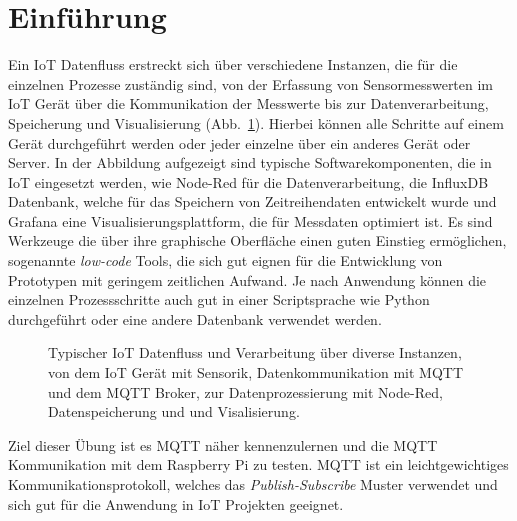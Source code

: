 \documentclass[
  11pt,
  a4paperpaper,
  oneside, openany  ,captions=tableheading
]{scrbook}
\theoremstyle{definition}
\theoremstyle{remark}
\begin{document}
\hfill\break

\section{Einführung}\label{einfuxfchrung-6}

Ein IoT Datenfluss erstreckt sich über verschiedene Instanzen, die für
die einzelnen Prozesse zuständig sind, von der Erfassung von
Sensormesswerten im IoT Gerät über die Kommunikation der Messwerte bis
zur Datenverarbeitung, Speicherung und Visualisierung
(Abb.~\ref{fig-iotpipeline}). Hierbei können alle Schritte auf einem
Gerät durchgeführt werden oder jeder einzelne über ein anderes Gerät
oder Server. In der Abbildung aufgezeigt sind typische
Softwarekomponenten, die in IoT eingesetzt werden, wie Node-Red für die
Datenverarbeitung, die InfluxDB Datenbank, welche für das Speichern von
Zeitreihendaten entwickelt wurde und Grafana eine
Visualisierungsplattform, die für Messdaten optimiert ist. Es sind
Werkzeuge die über ihre graphische Oberfläche einen guten Einstieg
ermöglichen, sogenannte \emph{low-code} Tools, die sich gut eignen für
die Entwicklung von Prototypen mit geringem zeitlichen Aufwand. Je nach
Anwendung können die einzelnen Prozessschritte auch gut in einer
Scriptsprache wie Python durchgeführt oder eine andere Datenbank
verwendet werden.

\begin{figure}


\caption{\label{fig-iotpipeline}Typischer IoT Datenfluss und
Verarbeitung über diverse Instanzen, von dem IoT Gerät mit Sensorik,
Datenkommunikation mit MQTT und dem MQTT Broker, zur Datenprozessierung
mit Node-Red, Datenspeicherung und und Visalisierung.}

\end{figure}%

Ziel dieser Übung ist es MQTT näher kennenzulernen und die MQTT
Kommunikation mit dem Raspberry Pi zu testen. MQTT ist ein
leichtgewichtiges Kommunikationsprotokoll, welches das
\emph{Publish-Subscribe} Muster verwendet und sich gut für die Anwendung
in IoT Projekten geeignet.
\end{document}
